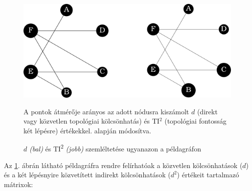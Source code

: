 \documentclass[a4paper,12pt]{article}
\begin{document}
 	 \begin{figure}[H]
 		 \includegraphics[scale=1]{img/graphs.png}
 		 \centering
 		 \caption{$d$ \textit{(bal)} és TI\textsuperscript{2} \textit{(jobb)} szemléltetése ugyanazon a példagráfon }
 		 A pontok átmérője arányos az adott nódusra kiszámolt $d$ (direkt vagy közvetlen topológiai kölcsönhatás) és TI$^2$ (topológiai fontosság két lépésre) értékekkel. \cite{ti} alapján módosítva.
 		 \label{fig:peldagraph}
 	 \end{figure}
 	 
 	 Az \ref{fig:peldagraph}. ábrán látható példagráfra rendre felírhatóak a közvetlen  kölcsönhatások ($d$) és a két lépésnyire közvetített indirekt kölcsönhatások ($d^2$) értékeit tartalmazó mátrixok:
	
\end{document}
